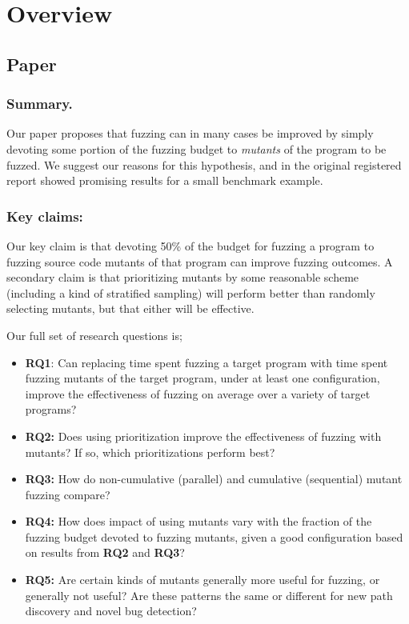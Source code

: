 \documentclass[manuscript,screen,review]{acmart}
\begin{document}
\section{Overview}

\subsection{Paper}

\subsubsection{Summary.} Our paper proposes that fuzzing can in many cases be improved by
simply devoting some portion of the fuzzing budget to \emph{mutants}
of the program to be fuzzed.  We suggest our reasons for this
hypothesis, and in the original registered report showed promising
results for a small benchmark example.

\subsubsection{Key claims:}  Our key claim is that devoting 50\% of
the budget for fuzzing a program to fuzzing source code mutants of
that program can improve fuzzing outcomes.  A secondary claim is that
prioritizing mutants by some reasonable scheme (including a kind of
stratified sampling) will perform better than randomly selecting
mutants, but that either will be effective.

Our full set of research questions is;

\begin{itemize}
    \item {\bf RQ1}: Can replacing time spent fuzzing a target program with time spent fuzzing mutants of the target program, under at least one configuration, improve
    the effectiveness of fuzzing on average over a variety of target programs?
    \item {\bf RQ2:} Does using prioritization improve the effectiveness of fuzzing with mutants?  If so, which prioritizations perform best?
    \item {\bf RQ3:} How do non-cumulative (parallel) and cumulative (sequential) mutant fuzzing compare?
    \item {\bf RQ4:} How does impact of using mutants vary with the fraction of the fuzzing budget devoted to fuzzing mutants, given a good configuration based on results from {\bf RQ2} and {\bf RQ3}?
    \item {\bf RQ5:} Are certain kinds of mutants generally more useful for fuzzing, or generally not useful?  Are these patterns the same or different for new path discovery and novel bug detection?
    \end{itemize}
\end{document}
